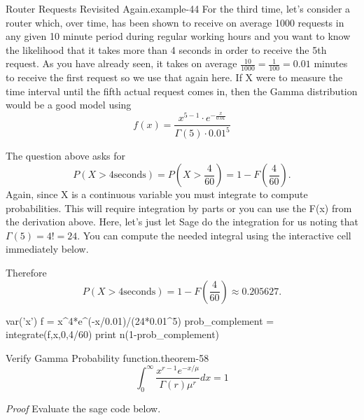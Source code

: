 \documentclass[10pt,]{book}
\makeatletter
\renewcommand*{\proofname}{Proof}
\renewenvironment{proof}[1][\proofname]{\par
  \pushQED{\qed}%
  \normalfont \topsep6\p@\@plus6\p@\relax
  \trivlist
  \item\relax
    {\itshape
    #1\@addpunct{.}}\hspace\labelsep\ignorespaces
}{%
  \popQED\endtrivlist\@endpefalse
}
\numberwithin{equation}{section}
\newcommand{\gt}{>}
\makeatother
\begin{document}
\begin{example}{Router Requests Revisited Again.}{example-44}%
\hypertarget{p-1148}{}%
For the third time, let's consider a router which, over time, has been shown to receive on average 1000 requests in any given 10 minute period during regular working hours and you want to know the likelihood that it takes more than 4 seconds in order to receive the 5th request. As you have already seen, it takes on average \(\frac{10}{1000} = \frac{1}{100} = 0.01\) minutes to receive the first request so we use that again here. If X were to measure the time interval until the fifth actual request comes in, then the Gamma distribution would be a good model using%
\begin{equation*}
f(x) =  \frac{x^{5-1} \cdot e^{- \frac{x}{0.01}}}{\Gamma(5) \cdot 0.01^5}
\end{equation*}
%
\par
\hypertarget{p-1149}{}%
The question above asks for%
\begin{equation*}
P(X \gt 4 \text{seconds}) = P(X \gt \frac{4}{60} ) = 1 - F(\frac{4}{60}).
\end{equation*}
Again, since X is a continuous variable you must integrate to compute probabilities. This will require integration by parts or you can use the F(x) from the derivation above. Here, let's just let Sage do the integration for us noting that \(\Gamma(5) = 4! = 24\). You can compute the needed integral using the interactive cell immediately below.%
\end{example}
%
\par
\hypertarget{p-1150}{}%
Therefore%
\begin{equation*}
P(X \gt 4 \text{seconds}) = 1 - F(\frac{4}{60}) \approx 0.205627.
\end{equation*}
%
\par
\hypertarget{p-1151}{}%
\leavevmode%
\begin{sageinput}
var('x')
f = x^4*e^(-x/0.01)/(24*0.01^5)
prob_complement = integrate(f,x,0,4/60)
print n(1-prob_complement)
\end{sageinput}
%
\par
\hypertarget{p-1152}{}%
\begin{theorem}{Verify Gamma Probability function.}{}{theorem-58}%
\hypertarget{p-1153}{}%
%
\begin{equation*}
\int_0^{\infty} \frac{x^{r-1} e^{-x/ \mu}}{\Gamma(r) \mu^r} dx = 1
\end{equation*}
%
\end{theorem}
\begin{proof}\hypertarget{proof-61}{}
\hypertarget{p-1154}{}%
Evaluate the sage code below.%
\end{proof}
\end{document}
